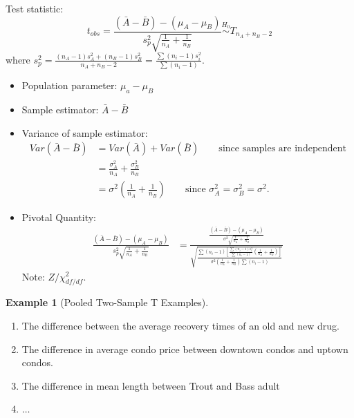 \documentclass[11pt]{article}
\theoremstyle{definition}
\newtheorem{example}{Example}[section]
\numberwithin{equation}{section}
\begin{document}
Test statistic:
\begin{equation*}
  t_{obs} = \frac{(\bar{A} - \bar{B}) - (\mu_A - \mu_B)}{s_p^2\sqrt{\frac{1}{n_A} + \frac{1}{n_B}}}\stackrel{H_0}{\sim}T_{n_A+n_B-2}
\end{equation*}
where $s_p^2=\frac{(n_A-1)s_A^2+(n_B-1)s_B^2}{n_A + n_B - 2}=\frac{\sum(n_i-1)s_i^2}{\sum(n_i-1)}$.

\begin{itemize}
  \item Population parameter: $\mu_a - \mu_B$
  \item Sample estimator: $\bar{A} - \bar{B}$
  \item Variance of sample estimator:
  \begin{align*}
    Var(\bar{A} - \bar{B})&= Var(\bar{A}) + Var(\bar{B})\qquad\text{since samples are independent}\\
    &=\frac{\sigma^2_A}{n_A} + \frac{\sigma^2_B}{n_B}\\
    &=\sigma^2\left(\frac{1}{n_A} + \frac{1}{n_B}\right)\qquad\text{since }\sigma_A^2=\sigma_B^2=\sigma^2.
  \end{align*}
  \item Pivotal Quantity:
  \begin{align*}
    \frac{(\bar{A} - \bar{B}) - (\mu_A - \mu_B)}{s_p^2\sqrt{\frac{1}{n_A} + \frac{1}{n_B}}} &= \frac{\frac{(\bar{A} - \bar{B}) - (\mu_A - \mu_B)}{\sigma^2\sqrt{\frac{1}{n_A} + \frac{1}{n_B}}}}{\sqrt{\frac{\sum(n_i - 1)\left[\frac{\sum(n_i-1)s_i^2}{\sum(n_i-1)}\left(\frac{1}{n_A} + \frac{1}{n_B}\right)\right]}{\sigma^2\left(\frac{1}{n_A} + \frac{1}{n_B}\right)\sum(n_i-1)}}}
  \end{align*}
  Note: $Z/\chi^2_{df/df}$.
\end{itemize}

\begin{example}[Pooled Two-Sample T Examples]
  \begin{enumerate}
    \item The difference between the average recovery times of an old and new drug.
    \item The difference in average condo price between downtown condos and uptown condos.
    \item The difference in mean length between Trout and Bass adult
    \item $\dots$
  \end{enumerate}
\end{example}
\end{document}

